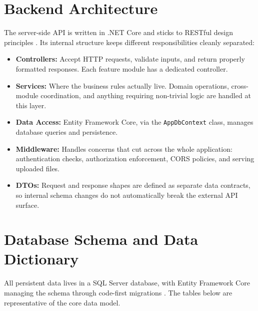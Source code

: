 \documentclass{thesis-library}
\begin{document}
\section{Backend Architecture}
The server-side API is written in .NET Core and sticks to RESTful design principles \cite{masse2011rest}. Its internal structure keeps different responsibilities cleanly separated:
\begin{itemize}
    \item \textbf{Controllers:} Accept HTTP requests, validate inputs, and return properly formatted responses. Each feature module has a dedicated controller.
    \item \textbf{Services:} Where the business rules actually live. Domain operations, cross-module coordination, and anything requiring non-trivial logic are handled at this layer.
    \item \textbf{Data Access:} Entity Framework Core, via the \texttt{AppDbContext} class, manages database queries and persistence.
    \item \textbf{Middleware:} Handles concerns that cut across the whole application: authentication checks, authorization enforcement, CORS policies, and serving uploaded files.
    \item \textbf{DTOs:} Request and response shapes are defined as separate data contracts, so internal schema changes do not automatically break the external API surface.
\end{itemize}

\section{Database Schema and Data Dictionary}
All persistent data lives in a SQL Server database, with Entity Framework Core managing the schema through code-first migrations \cite{coronel2016database}. The tables below are representative of the core data model.
\end{document}
